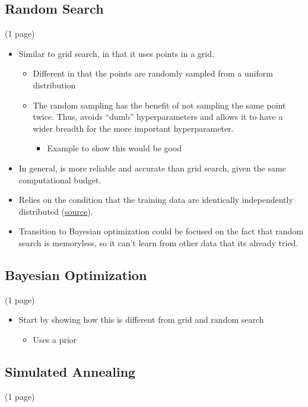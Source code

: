 \documentclass[stu,12pt,floatsintext]{apa7}
\begin{document}
\subsection{Random Search}
(1 page)
\begin{itemize}
    \item Similar to grid search, in that it uses points in a grid.
    \begin{itemize}
        \item Different in that the points are randomly sampled from a uniform distribution
        \item The random sampling has the benefit of not sampling the same point twice. Thus, avoids ``dumb'' hyperparameters and allows it to have a wider breadth for the more important hyperparameter. 
        \begin{itemize}
            \item Example to show this would be good 
        \end{itemize}
    \end{itemize}
    \item In general, is more reliable and accurate than grid search, given the same computational budget. 
    \item Relies on the condition that the training data are identically independently distributed (\href{https://www.jmlr.org/papers/volume13/bergstra12a/bergstra12a.pdf}{source}).
    \item Transition to Bayesian optimization could be focused on the fact that random search is memoryless, so it can't learn from other data that its already tried.
\end{itemize}

\subsection{Bayesian Optimization}
(1 page)
\begin{itemize}
    \item Start by showing how this is different from grid and random search
    \begin{itemize}
        \item Uses a prior 
    \end{itemize}
\end{itemize}

\subsection{Simulated Annealing}
(1 page)
\end{document}
